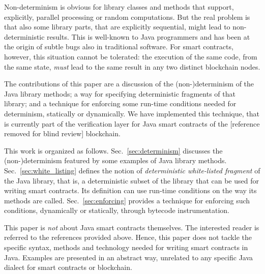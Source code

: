 Non-determinism is obvious for library classes and methods that support, explicitly,
parallel processing or random computations. But the real problem is that
also some library parts, that are explicitly sequential, might lead to
non-deterministic results.
This is well-known to Java programmers and has been at the origin of subtle
bugs also in traditional software. For smart contracts, however,
this situation cannot be tolerated: the execution of the same code, from the same state,
\emph{must} lead to the same result in any two distinct blockchain nodes.

The contributions of this paper are a discussion of the (non-)determinism
of the Java library methods; a way for specifying deterministic fragments
of that library; and a technique for
enforcing some run-time conditions needed for determinism, statically or dynamically.
We have implemented this technique, that is currently part of the verification
layer for Java smart contracts of the [reference removed for blind review] blockchain.

This work is organized as follows.
Sec.~\ref{sec:determinism} discusses the (non-)determinism featured by some
examples of Java library methods.
Sec.~\ref{sec:white_listing} defines the notion of \emph{deterministic white-listed fragment} of the Java library,
that is, a deterministic subset of the library that can be used for writing smart contracts.
Its definition can use run-time conditions on the way its methods are called.
Sec.~\ref{sec:enforcing} provides a technique for enforcing such conditions, dynamically
or statically, through bytecode instrumentation.

This paper is \emph{not} about Java smart contracts themselves. The interested reader
is referred to the references provided above. Hence, this paper does not tackle
the specific syntax, methods and technology needed for writing smart contracts in Java.
Examples are presented in an abstract way, unrelated to any specific
Java dialect for smart contracts or blockchain.
